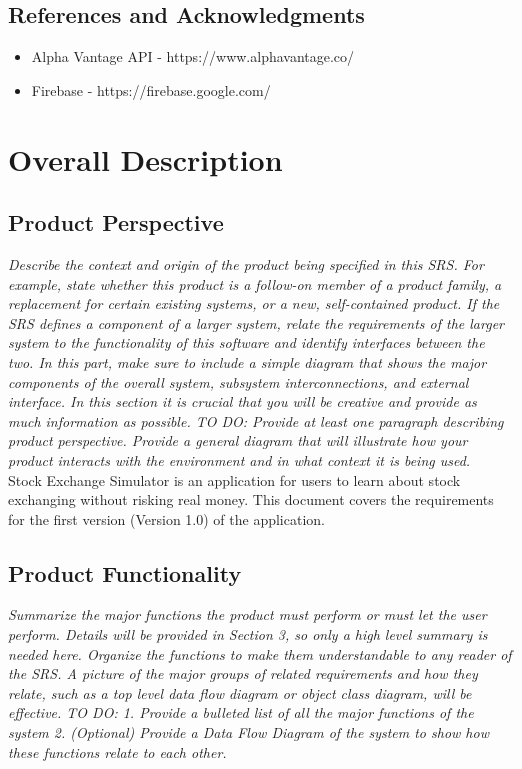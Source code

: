 \documentclass[12 pt, a4paper]{report}
\begin{document}
	\section {References and Acknowledgments}
	\begin{itemize}
		\item Alpha Vantage API - https://www.alphavantage.co/
		\item Firebase - https://firebase.google.com/
	\end{itemize}
	
	\chapter {Overall Description}
	\section {Product Perspective}
	\textit{Describe the context and origin of the product being specified in this SRS. For example, state whether this product is a follow-on member of a product family, a replacement for certain existing systems, or a new, self-contained product. If the SRS defines a component of a larger system, relate the requirements of the larger system to the functionality of this software and identify interfaces between the two. In this part, make sure to include a simple diagram that shows the major components of the overall system, subsystem interconnections, and external interface. In this section it is crucial that you will be creative and provide as much information as possible. TO DO: Provide at least one paragraph describing product perspective. Provide a general diagram that will illustrate how your product interacts with the environment and in what context it is being used.}\\
	Stock Exchange Simulator is an application for users to learn about stock exchanging without risking real money. This document covers the requirements for the first version (Version 1.0) of the application.
	
	\section {Product Functionality} 
	\textit{Summarize the major functions the product must perform or must let the user perform. Details will be provided in Section 3, so only a high level summary is needed here. Organize the functions to make them understandable to any reader of the SRS. A picture of the major groups of related requirements and how they relate, such as a top level data flow diagram or object class diagram, will be effective.
	TO DO: 
	1. Provide a bulleted list of all the major functions of the system
	2. (Optional) Provide a Data Flow Diagram of the system to show how these functions relate to each other.}
\end{document}

